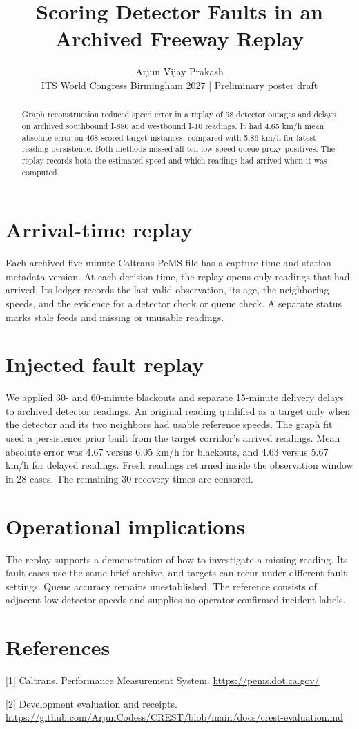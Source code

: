 \documentclass[10pt,letterpaper]{article}
\date{}
\title{Scoring Detector Faults in an Archived Freeway Replay}
\author{Arjun Vijay Prakash \\ \small ITS World Congress Birmingham 2027 | Preliminary poster
draft}
\begin{document}
\maketitle
\begin{abstract}
Graph reconstruction reduced speed error in a replay of 58 detector outages and delays
on archived southbound I-880 and westbound I-10 readings. It had 4.65 km/h mean absolute
error on 468 scored target instances, compared with 5.86 km/h for latest-reading
persistence. Both methods missed all ten low-speed queue-proxy positives. The replay
records both the estimated speed and which readings had arrived when it was computed.
\end{abstract}

\section*{Arrival-time replay}
Each archived five-minute Caltrans PeMS file has a capture time and station metadata version.
At each decision time, the replay opens only readings that had arrived. Its ledger records
the last valid observation, its age, the neighboring speeds, and the evidence for a detector
check or queue check. A separate status marks stale feeds and missing or unusable readings.

\section*{Injected fault replay}
We applied 30- and 60-minute blackouts and separate 15-minute delivery delays to archived
detector readings. An original reading qualified as a target only when the detector and its
two neighbors had usable reference speeds. The graph fit used a persistence prior built
from the target corridor's arrived readings. Mean absolute error was 4.67 versus 6.05 km/h
for blackouts, and 4.63 versus 5.67 km/h for delayed readings. Fresh readings returned
inside the observation window in 28 cases. The remaining 30 recovery times are censored.

\section*{Operational implications}
The replay supports a demonstration of how to investigate a missing reading. Its fault
cases use the same brief archive, and targets can recur under different fault settings.
Queue accuracy remains unestablished. The reference consists of adjacent low detector
speeds and supplies no operator-confirmed incident labels.

\section*{References}
[1] Caltrans. Performance Measurement System. \url{https://pems.dot.ca.gov/}

[2] Development evaluation and receipts.
\url{https://github.com/ArjunCodess/CREST/blob/main/docs/crest-evaluation.md}
\end{document}
